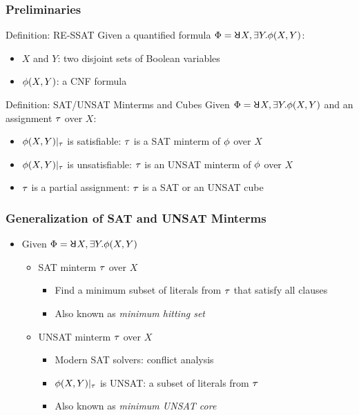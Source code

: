 \begin{frame}
    \frametitle{Preliminaries}
    \begin{block}{Definition: RE-SSAT}
        Given a quantified formula $\Qf=\random{} X,\exists Y.\pf(X,Y)$:
        \begin{itemize}
            \item $X$ and $Y$: two disjoint sets of Boolean variables
            \item $\phi(X,Y)$: a CNF formula
        \end{itemize}
    \end{block}
    \pause
    \begin{block}{Definition: SAT/UNSAT Minterms and Cubes}
        Given $\Qf=\random{} X,\exists Y.\pf(X,Y)$ and an assignment $\tau$ over $X$:
        \begin{itemize}
            \item $\phi(X,Y)|_{\tau}$ is satisfiable: $\tau$ is a SAT minterm of $\phi$ over $X$
            \item $\phi(X,Y)|_{\tau}$ is unsatisfiable: $\tau$ is an UNSAT minterm of $\phi$ over $X$
            \item $\tau$ is a partial assignment: $\tau$ is a SAT or an UNSAT cube
        \end{itemize}
    \end{block}
\end{frame}

\begin{frame}
    \frametitle{Generalization of SAT and UNSAT Minterms}
    \begin{itemize}
        \item Given $\Qf=\random{} X,\exists Y.\pf(X,Y)$
              \begin{itemize}
                  \item SAT minterm $\tau$ over $X$
                        \begin{itemize}
                            \item Find a minimum subset of literals from $\tau$ that satisfy all clauses
                            \item Also known as \textit{minimum hitting set}
                        \end{itemize}
                  \item UNSAT minterm $\tau$ over $X$
                        \begin{itemize}
                            \item Modern SAT solvers: conflict analysis
                            \item $\phi(X,Y)|_{\tau}$ is UNSAT: a subset of literals from $\tau$
                            \item Also known as \textit{minimum UNSAT core}
                        \end{itemize}
              \end{itemize}
    \end{itemize}
\end{frame}